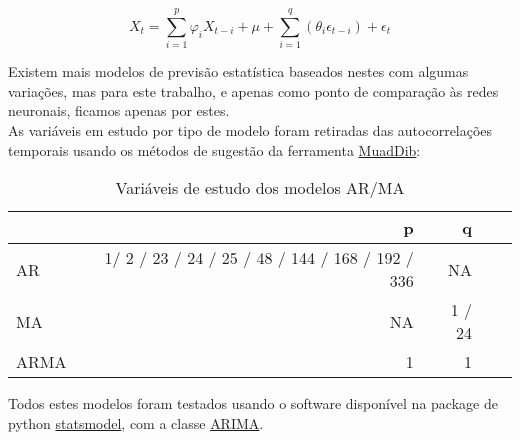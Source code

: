 \begin{equation} \label{eq:ma} 
    X_{t} = \sum_{i=1}^{p}\varphi_{i} X_{t-i}  + \mu + \sum_{i=1}^{q}(\theta_{i} \epsilon_{t-i}) + \epsilon_{t}
\end{equation}
\smallskip

Existem mais modelos de previsão estatística baseados nestes com algumas variações, mas para este trabalho, e apenas como ponto de comparação às redes neuronais, ficamos apenas por estes.\\
As variáveis em estudo por tipo de modelo foram retiradas das autocorrelações temporais usando os métodos de sugestão da ferramenta \hyperref[se:muaddib]{MuadDib}:\\


\begin{table}[h] \centering
\begin{tabular}{lrrrr}
    \toprule
     & p & q \\
    \midrule
    AR & 1/ 2 / 23 / 24 / 25 / 48 / 144 / 168 / 192 / 336 & NA \\
    MA & NA & 1 / 24 \\
    ARMA & 1 & 1 \\
    \bottomrule
    \end{tabular}
    \label{tab:varsstats} 
    \caption{Variáveis de estudo dos modelos AR/MA}
\end{table}


Todos estes modelos foram testados usando o software disponível na package de python \href{https://www.statsmodels.org/stable/index.html}{statsmodel}, com a classe \href{https://www.statsmodels.org/stable/generated/statsmodels.tsa.arima.model.ARIMA.html}{ARIMA}.
